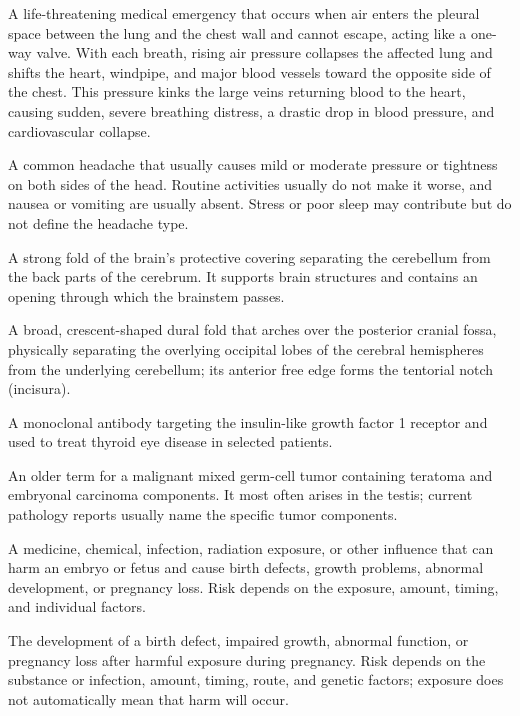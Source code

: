  A life-threatening medical emergency that occurs when air enters the pleural space between the lung and the chest wall and cannot escape, acting like a one-way valve. With each breath, rising air pressure collapses the affected lung and shifts the heart, windpipe, and major blood vessels toward the opposite side of the chest. This pressure kinks the large veins returning blood to the heart, causing sudden, severe breathing distress, a drastic drop in blood pressure, and cardiovascular collapse.

 A common headache that usually causes mild or moderate pressure or tightness on both sides of the head. Routine activities usually do not make it worse, and nausea or vomiting are usually absent. Stress or poor sleep may contribute but do not define the headache type.

 A strong fold of the brain’s protective covering separating the cerebellum from the back parts of the cerebrum. It supports brain structures and contains an opening through which the brainstem passes.

 A broad, crescent-shaped dural fold that arches over the posterior cranial fossa, physically separating the overlying occipital lobes of the cerebral hemispheres from the underlying cerebellum; its anterior free edge forms the tentorial notch (incisura).

 A monoclonal antibody targeting the insulin-like growth factor 1 receptor and used to treat thyroid eye disease in selected patients.

 An older term for a malignant mixed germ-cell tumor containing teratoma and embryonal carcinoma components. It most often arises in the testis; current pathology reports usually name the specific tumor components.

 A medicine, chemical, infection, radiation exposure, or other influence that can harm an embryo or fetus and cause birth defects, growth problems, abnormal development, or pregnancy loss. Risk depends on the exposure, amount, timing, and individual factors.

 The development of a birth defect, impaired growth, abnormal function, or pregnancy loss after harmful exposure during pregnancy. Risk depends on the substance or infection, amount, timing, route, and genetic factors; exposure does not automatically mean that harm will occur.

